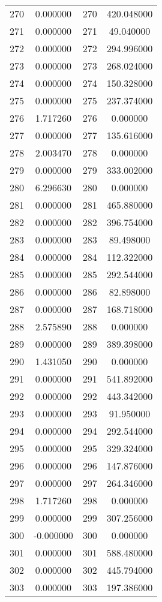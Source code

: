 \documentclass[12pt]{article}
\begin{document}
\begin{longtable}{@{}cccc@{}}
270 & 0.000000 & 270 & 420.048000 \\
271 & 0.000000 & 271 & 49.040000 \\
272 & 0.000000 & 272 & 294.996000 \\
273 & 0.000000 & 273 & 268.024000 \\
274 & 0.000000 & 274 & 150.328000 \\
275 & 0.000000 & 275 & 237.374000 \\
276 & 1.717260 & 276 & 0.000000 \\
277 & 0.000000 & 277 & 135.616000 \\
278 & 2.003470 & 278 & 0.000000 \\
279 & 0.000000 & 279 & 333.002000 \\
280 & 6.296630 & 280 & 0.000000 \\
281 & 0.000000 & 281 & 465.880000 \\
282 & 0.000000 & 282 & 396.754000 \\
283 & 0.000000 & 283 & 89.498000 \\
284 & 0.000000 & 284 & 112.322000 \\
285 & 0.000000 & 285 & 292.544000 \\
286 & 0.000000 & 286 & 82.898000 \\
287 & 0.000000 & 287 & 168.718000 \\
288 & 2.575890 & 288 & 0.000000 \\
289 & 0.000000 & 289 & 389.398000 \\
290 & 1.431050 & 290 & 0.000000 \\
291 & 0.000000 & 291 & 541.892000 \\
292 & 0.000000 & 292 & 443.342000 \\
293 & 0.000000 & 293 & 91.950000 \\
294 & 0.000000 & 294 & 292.544000 \\
295 & 0.000000 & 295 & 329.324000 \\
296 & 0.000000 & 296 & 147.876000 \\
297 & 0.000000 & 297 & 264.346000 \\
298 & 1.717260 & 298 & 0.000000 \\
299 & 0.000000 & 299 & 307.256000 \\
300 & -0.000000 & 300 & 0.000000 \\
301 & 0.000000 & 301 & 588.480000 \\
302 & 0.000000 & 302 & 445.794000 \\
303 & 0.000000 & 303 & 197.386000 \\

\end{longtable}
\end{document}
